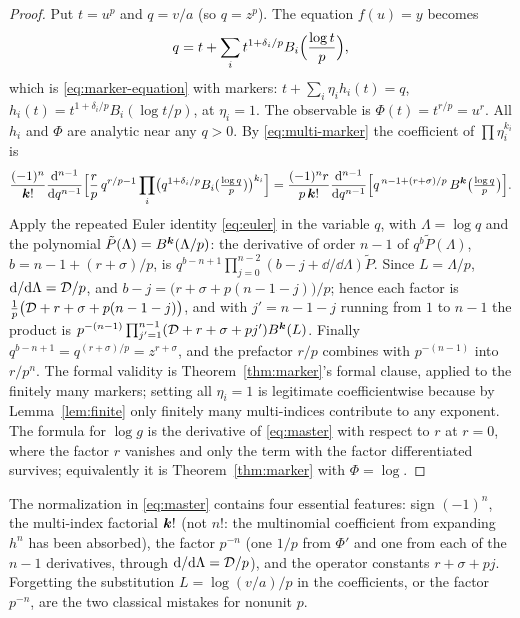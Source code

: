 \begin{proof}
Put $t=u^p$ and $q=v/a$ (so $q=z^p$). The equation $f(u)=y$ becomes
\[
 q=t+\sum_it^{1+\delta_i/p}B_i\Bigl(\frac{\log t}{p}\Bigr),
\]
which is \eqref{eq:marker-equation} with markers: $t+\sum_i\eta_ih_i(t)=q$, $h_i(t)=t^{1+\delta_i/p}B_i(\log t/p)$, at $\eta_i=1$. The observable is $\Phi(t)=t^{r/p}=u^r$. All $h_i$ and $\Phi$ are analytic near any $q>0$. By \eqref{eq:multi-marker} the coefficient of $\prod\eta_i^{k_i}$ is
\[
 \frac{(-1)^n}{\boldsymbol k!}\frac{\mathrm d^{n-1}}{\mathrm d q^{n-1}}\Bigl[\frac rp\,q^{r/p-1}\prod_i\bigl(q^{1+\delta_i/p}B_i(\tfrac{\log q}p)\bigr)^{k_i}\Bigr]
 =\frac{(-1)^n r}{p\,\boldsymbol k!}\frac{\mathrm d^{n-1}}{\mathrm d q^{n-1}}\Bigl[q^{\,n-1+(r+\sigma)/p}\,B^{\boldsymbol k}\bigl(\tfrac{\log q}p\bigr)\Bigr].
\]
Apply the repeated Euler identity \eqref{eq:euler} in the variable $q$, with $\Lambda=\log q$ and the polynomial $\tilde P(\Lambda)=B^{\boldsymbol k}(\Lambda/p)$: the derivative of order $n-1$ of $q^b\tilde P(\Lambda)$, $b=n-1+(r+\sigma)/p$, is $q^{b-n+1}\prod_{j=0}^{n-2}(b-j+\dd/\dd\Lambda)\tilde P$. Since $L=\Lambda/p$, $\mathrm d/\mathrm d\Lambda=\mathcal D/p$, and $b-j=\bigl(r+\sigma+p(n-1-j)\bigr)/p$; hence each factor is $\frac1p\bigl(\mathcal D+r+\sigma+p(n-1-j)\bigr)$, and with $j'=n-1-j$ running from $1$ to $n-1$ the product is $p^{-(n-1)}\prod_{j'=1}^{n-1}(\mathcal D+r+\sigma+pj')B^{\boldsymbol k}(L)$. Finally $q^{b-n+1}=q^{(r+\sigma)/p}=z^{r+\sigma}$, and the prefactor $r/p$ combines with $p^{-(n-1)}$ into $r/p^n$. The formal validity is Theorem~\ref{thm:marker}'s formal clause, applied to the finitely many markers; setting all $\eta_i=1$ is legitimate coefficientwise because by Lemma~\ref{lem:finite} only finitely many multi-indices contribute to any exponent. The formula for $\log g$ is the derivative of \eqref{eq:master} with respect to $r$ at $r=0$, where the factor $r$ vanishes and only the term with the factor differentiated survives; equivalently it is Theorem~\ref{thm:marker} with $\Phi=\log$.
\end{proof}

\begin{remark}
The normalization in \eqref{eq:master} contains four essential features: sign $(-1)^n$, the multi-index factorial $\boldsymbol k!$ (not $n!$: the multinomial coefficient from expanding $h^n$ has been absorbed), the factor $p^{-n}$ (one $1/p$ from $\Phi'$ and one from each of the $n-1$ derivatives, through $\mathrm d/\mathrm d\Lambda=\mathcal D/p$), and the operator constants $r+\sigma+pj$. Forgetting the substitution $L=\log(v/a)/p$ in the coefficients, or the factor $p^{-n}$, are the two classical mistakes for nonunit $p$.
\end{remark}

